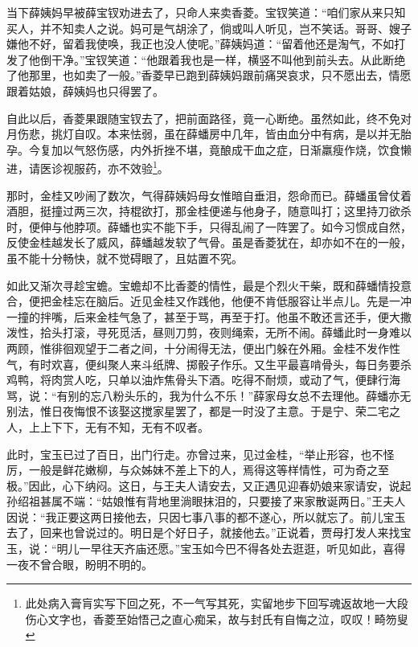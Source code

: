 \documentclass[12pt,oneside]{book}
\begin{document}
当下薛姨妈早被薛宝钗劝进去了，只命人来卖香菱。宝钗笑道：“咱们家从来只知买人，并不知卖人之说。妈可是气胡涂了，倘或叫人听见，岂不笑话。哥哥、嫂子嫌他不好，留着我使唤，我正也没人使呢。”薛姨妈道：“留着他还是淘气，不如打发了他倒干净。”宝钗笑道：“他跟着我也是一样，横竖不叫他到前头去。从此断绝了他那里，也如卖了一般。”香菱早已跑到薛姨妈跟前痛哭哀求，只不愿出去，情愿跟着姑娘，薛姨妈也只得罢了。

自此以后，香菱果跟随宝钗去了，把前面路径，竟一心断绝。虽然如此，终不免对月伤悲，挑灯自叹。本来怯弱，虽在薛蟠房中几年，皆由血分中有病，是以并无胎孕。今复加以气怒伤感，内外折挫不堪，竟酿成干血之症，日渐羸瘦作烧，饮食懒进，请医诊视服药，亦不效验\footnote{此处病入膏肓实写下回之死，不一气写其死，实留地步下回写魂返故地一大段伤心文字也，香菱至始悟己之直心痴呆，故与封氏有自悔之泣，叹叹！畸笏叟}。

那时，金桂又吵闹了数次，气得薛姨妈母女惟暗自垂泪，怨命而已。薛蟠虽曾仗着酒胆，挺撞过两三次，持棍欲打，那金桂便递与他身子，随意叫打；这里持刀欲杀时，便伸与他脖项。薛蟠也实不能下手，只得乱闹了一阵罢了。如今习惯成自然，反使金桂越发长了威风，薛蟠越发软了气骨。虽是香菱犹在，却亦如不在的一般，虽不能十分畅快，就不觉碍眼了，且姑置不究。

如此又渐次寻趁宝蟾。宝蟾却不比香菱的情性，最是个烈火干柴，既和薛蟠情投意合，便把金桂忘在脑后。近见金桂又作践他，他便不肯低服容让半点儿。先是一冲一撞的拌嘴，后来金桂气急了，甚至于骂，再至于打。他虽不敢还言还手，便大撒泼性，拾头打滚，寻死觅活，昼则刀剪，夜则绳索，无所不闹。薛蟠此时一身难以两顾，惟徘徊观望于二者之间，十分闹得无法，便出门躲在外厢。金桂不发作性气，有时欢喜，便纠聚人来斗纸牌、掷骰子作乐。又生平最喜啃骨头，每日务要杀鸡鸭，将肉赏人吃，只单以油炸焦骨头下酒。吃得不耐烦，或动了气，便肆行海骂，说：“有别的忘八粉头乐的，我为什么不乐！”薛家母女总不去理他。薛蟠亦无别法，惟日夜悔恨不该娶这搅家星罢了，都是一时没了主意。于是宁、荣二宅之人，上上下下，无有不知，无有不叹者。

此时，宝玉已过了百日，出门行走。亦曾过来，见过金桂，“举止形容，也不怪厉，一般是鲜花嫩柳，与众姊妹不差上下的人，焉得这等样情性，可为奇之至极。”因此，心下纳闷。这日，与王夫人请安去，又正遇见迎春奶娘来家请安，说起孙绍祖甚属不端：“姑娘惟有背地里淌眼抹泪的，只要接了来家散诞两日。”王夫人因说：“我正要这两日接他去，只因七事八事的都不遂心，所以就忘了。前儿宝玉去了，回来也曾说过的。明日是个好日子，就接他去。”正说着，贾母打发人来找宝玉，说：“明儿一早往天齐庙还愿。”宝玉如今巴不得各处去逛逛，听见如此，喜得一夜不曾合眼，盼明不明的。
\end{document}
